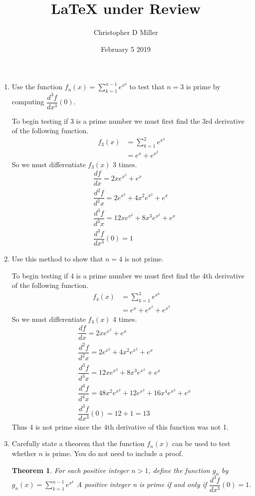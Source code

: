 \documentclass[12pt]{article}
\title{LaTeX under Review}
\author{Christopher D Miller}
\date{February 5 2019}
\theoremstyle{plain}
\newtheorem{theorem}{Theorem}
\begin{document}
\maketitle

\begin{enumerate}
\item Use the function \( \displaystyle{f_n(x) = \sum_{k=1}^{n-1} e^{x^k}} \) to test that $n=3$ is prime by computing 
\( \dfrac{d^3 f}{dx^3}(0) \).

To begin testing if 3 is a prime number we must first find the 3rd derivative of the following function.
    \begin{align*}
            f_3(x) &= \sum_{k=1}^{2}e^{x^k}\\
            &= e^x + e^{x^2} 
    \end{align*}
So we must differentiate $f_3(x)$ 3 times.
    \begin{align*}
        &\dfrac{d f}{dx} = 2 x e^{x^2}+e^x\\
        &\dfrac{d^2 f}{d^2x} =  2 e^{x^2}+4 x^2 e^{x^2}+e^x\\
        &\dfrac{d^3 f}{d^3x} = 12 x e^{x^2} +8 x^3 e^{x^2} 
        +e^x \\
        &\dfrac{d^3 f}{dx^3}(0) = 1
    \end{align*}


\item Use this method to show that $n=4$ is not prime.

To begin testing if 4 is a prime number we must first find the 4th derivative of the following function.
\begin{align*}
        f_4(x) &= \sum_{k=1}^{3}e^{x^k}\\
        &= e^x + e^{x^2} + e^{x^3} 
\end{align*}
So we must differentiate $f_4(x)$ 4 times.
\begin{align*}
    &\dfrac{d f}{dx} = 2 x e^{x^2} +e^x \\
    &\dfrac{d^2 f}{d^2x} =  2 e^{x^2}+4 x^2 e^{x^2}+e^x\\
    &\dfrac{d^3 f}{d^3x} = 12 x e^{x^2} +8 x^3 e^{x^2} 
    +e^x \\
    &\dfrac{d^4 f}{d^4x} = 48 x^2 e^{x^2} +12 e^{x^2} +16 x^4 e^{x^2} +e^x  \\
    &\dfrac{d^3 f}{dx^3}(0) = 12  + 1 =13
\end{align*}
Thus 4 is not prime since the 4th derivative of this function was not 1.

\item Carefully state a theorem that the function $f_n(x)$ can be used to test whether $n$ is prime.   You do not need to include a proof.
\begin{theorem}
    For each positive integer $n > 1$, define the function $g_n$ by $g_n(x) = \sum_{k=1}^{n-1}e^{x^k}$ A positive integer n is prime if and only if $\dfrac{d^3 f}{dx^3}(0) =1$.
\end{theorem}

\end{enumerate}
\end{document}
